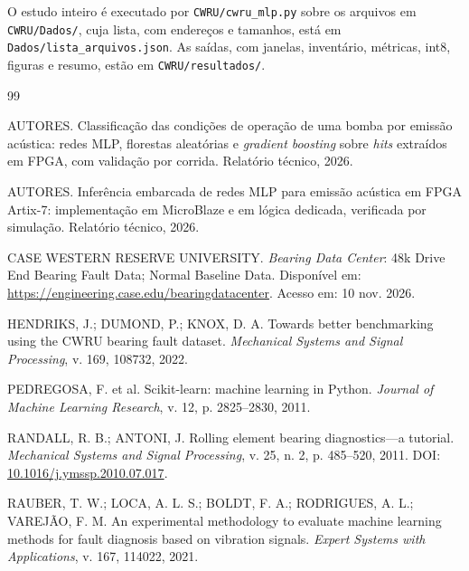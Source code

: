 \documentclass[12pt]{article}
\begin{document}
O estudo inteiro é executado por \texttt{CWRU/cwru\_mlp.py} sobre os arquivos em \texttt{CWRU/Dados/}, cuja lista, com endereços e tamanhos, está em \texttt{Dados/lista\_arquivos.json}. As saídas, com janelas, inventário, métricas, int8, figuras e resumo, estão em \texttt{CWRU/resultados/}.

\begin{thebibliography}{99}

	AUTORES.
	\newblock Classificação das condições de operação de uma bomba por emissão acústica: redes MLP, florestas aleatórias e \textit{gradient boosting} sobre \textit{hits} extraídos em FPGA, com validação por corrida.
	\newblock Relatório técnico, 2026.

	AUTORES.
	\newblock Inferência embarcada de redes MLP para emissão acústica em FPGA Artix-7: implementação em MicroBlaze e em lógica dedicada, verificada por simulação.
	\newblock Relatório técnico, 2026.

	CASE WESTERN RESERVE UNIVERSITY.
	\newblock \emph{Bearing Data Center}: 48k Drive End Bearing Fault Data; Normal Baseline Data.
	\newblock Disponível em: \url{https://engineering.case.edu/bearingdatacenter}. Acesso em: 10 nov. 2026.

	HENDRIKS, J.; DUMOND, P.; KNOX, D. A.
	\newblock Towards better benchmarking using the CWRU bearing fault dataset.
	\newblock \emph{Mechanical Systems and Signal Processing}, v. 169, 108732, 2022.

	PEDREGOSA, F. et al.
	\newblock Scikit-learn: machine learning in Python.
	\newblock \emph{Journal of Machine Learning Research}, v. 12, p. 2825--2830, 2011.

	RANDALL, R. B.; ANTONI, J.
	\newblock Rolling element bearing diagnostics---a tutorial.
	\newblock \emph{Mechanical Systems and Signal Processing}, v. 25, n. 2, p. 485--520, 2011.
	\newblock DOI: \href{https://doi.org/10.1016/j.ymssp.2010.07.017}{10.1016/j.ymssp.2010.07.017}.

	RAUBER, T. W.; LOCA, A. L. S.; BOLDT, F. A.; RODRIGUES, A. L.; VAREJÃO, F. M.
	\newblock An experimental methodology to evaluate machine learning methods for fault diagnosis based on vibration signals.
	\newblock \emph{Expert Systems with Applications}, v. 167, 114022, 2021.


\end{thebibliography}
\end{document}
